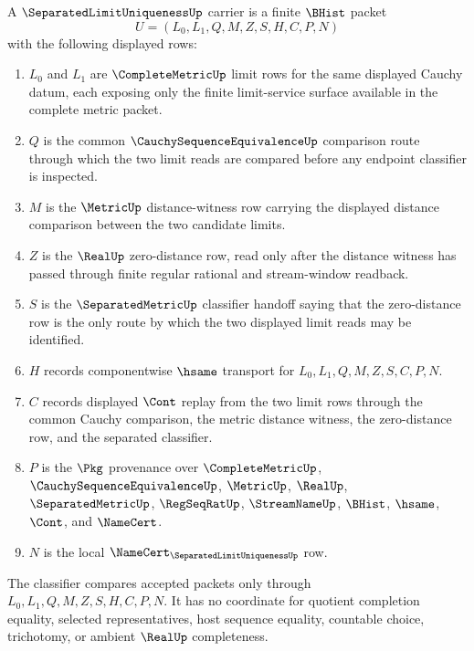 \begin{definition}\label{def:separated-limit-uniqueness-carrier}
A $\SeparatedLimitUniquenessUp$ carrier is a finite $\BHist$ packet
$$
U=(L_{0},L_{1},Q,M,Z,S,H,C,P,N)
$$
with the following displayed rows:
\begin{enumerate}
\item $L_{0}$ and $L_{1}$ are $\CompleteMetricUp$ limit rows for the same displayed Cauchy datum, each exposing only the finite limit-service surface available in the complete metric packet.
\item $Q$ is the common $\CauchySequenceEquivalenceUp$ comparison route through which the two limit reads are compared before any endpoint classifier is inspected.
\item $M$ is the $\MetricUp$ distance-witness row carrying the displayed distance comparison between the two candidate limits.
\item $Z$ is the $\RealUp$ zero-distance row, read only after the distance witness has passed through finite regular rational and stream-window readback.
\item $S$ is the $\SeparatedMetricUp$ classifier handoff saying that the zero-distance row is the only route by which the two displayed limit reads may be identified.
\item $H$ records componentwise $\hsame$ transport for $L_{0},L_{1},Q,M,Z,S,C,P,N$.
\item $C$ records displayed $\Cont$ replay from the two limit rows through the common Cauchy comparison, the metric distance witness, the zero-distance row, and the separated classifier.
\item $P$ is the $\Pkg$ provenance over $\CompleteMetricUp$, $\CauchySequenceEquivalenceUp$, $\MetricUp$, $\RealUp$, $\SeparatedMetricUp$, $\RegSeqRatUp$, $\StreamNameUp$, $\BHist$, $\hsame$, $\Cont$, and $\NameCert$.
\item $N$ is the local $\NameCert_{\SeparatedLimitUniquenessUp}$ row.
\end{enumerate}
The classifier compares accepted packets only through $L_{0},L_{1},Q,M,Z,S,H,C,P,N$. It has no coordinate for quotient completion equality, selected representatives, host sequence equality, countable choice, trichotomy, or ambient $\RealUp$ completeness.
\end{definition}

